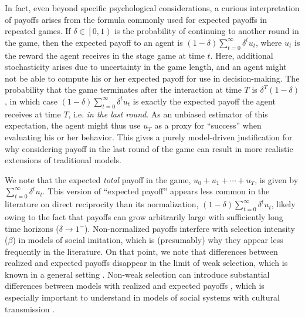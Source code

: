 \documentclass[11pt]{article}
\theoremstyle{plainCl1}
\theoremstyle{plainCl2}
\begin{document}
In fact, even beyond specific psychological considerations, a curious interpretation of payoffs arises from the formula commonly used for expected payoffs in repeated games. If $\delta\in\left[0,1\right)$ is the probability of continuing to another round in the game, then the expected payoff to an agent is $\left(1-\delta\right)\sum_{t=0}^{\infty}\delta^{t}u_{t}$, where $u_{t}$ is the reward the agent receives in the stage game at time $t$. Here, additional stochasticity arises due to uncertainty in the game length, and an agent might not be able to compute his or her expected payoff for use in decision-making. The probability that the game terminates after the interaction at time $T$ is $\delta^{T}\left(1-\delta\right)$, in which case $\left(1-\delta\right)\sum_{t=0}^{\infty}\delta^{t}u_{t}$ is exactly the expected payoff the agent receives at time $T$, i.e. \emph{in the last round}. As an unbiased estimator of this expectation, the agent might thus use $u_{T}$ as a proxy for ``success'' when evaluating his or her behavior. This gives a purely model-driven justification for why considering payoff in the last round of the game can result in more realistic extensions of traditional models.

We note that the expected \emph{total} payoff in the game, $u_{0}+u_{1}+\cdots +u_{T}$, is given by $\sum_{t=0}^{\infty}\delta^{t}u_{t}$. This version of ``expected payoff'' appears less common in the literature on direct reciprocity than its normalization, $\left(1-\delta\right)\sum_{t=0}^{\infty}\delta^{t}u_{t}$, likely owing to the fact that payoffs can grow arbitrarily large with sufficiently long time horizons ($\delta\rightarrow 1^{-}$). Non-normalized payoffs interfere with selection intensity ($\beta$) in models of social imitation, which is (presumably) why they appear less frequently in the literature. On that point, we note that differences between realized and expected payoffs disappear in the limit of weak selection, which is known in a general setting \citep{mcavoy:NHB:2020}. Non-weak selection can introduce substantial differences between models with realized and expected payoffs \citep{mcavoy:PLOSCB:2021}, which is especially important to understand in models of social systems with cultural transmission \citep{cavalli1981cultural}.
\end{document}
